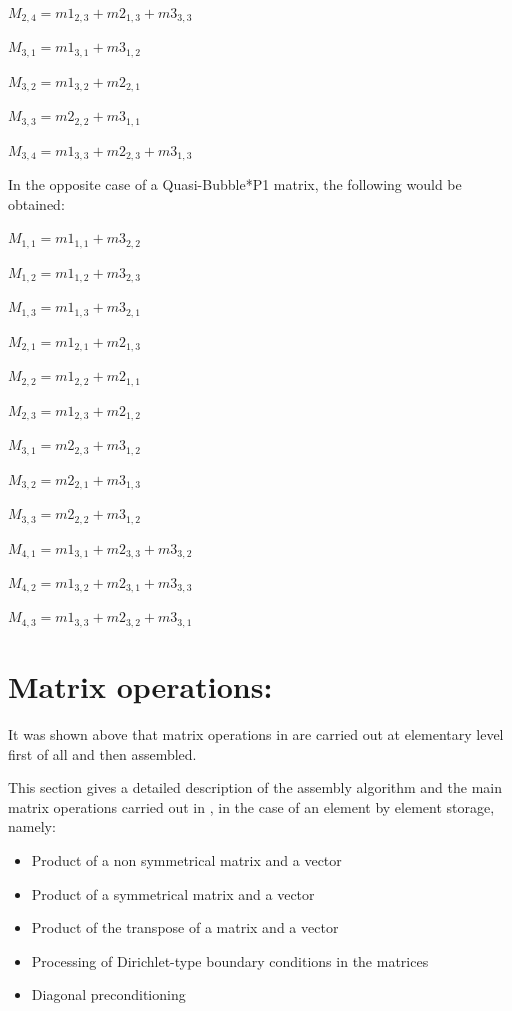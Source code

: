 $M_{2,4} = m1_{2,3} + m2_{1,3} + m3_{3,3}$

$M_{3,1} = m1_{3,1} + m3_{1,2}$

$M_{3,2} = m1_{3,2} + m2_{2,1}$

$M_{3,3} = m2_{2,2} + m3_{1,1}$

$M_{3,4} = m1_{3,3} + m2_{2,3} + m3_{1,3}$

In the opposite case of a Quasi-Bubble*P1 matrix, the following would be obtained:

$M_{1,1} = m1_{1,1} + m3_{2,2}$

$M_{1,2} = m1_{1,2} + m3_{2,3}$

$M_{1,3} = m1_{1,3} + m3_{2,1}$

$M_{2,1} = m1_{2,1} + m2_{1,3}$

$M_{2,2} = m1_{2,2} + m2_{1,1}$

$M_{2,3} = m1_{2,3} + m2_{1,2}$

$M_{3,1} = m2_{2,3} + m3_{1,2}$

$M_{3,2} = m2_{2,1} + m3_{1,3}$

$M_{3,3} = m2_{2,2} + m3_{1,2}$

$M_{4,1} = m1_{3,1} + m2_{3,3} + m3_{3,2}$

$M_{4,2} = m1_{3,2} + m2_{3,1} + m3_{3,3}$

$M_{4,3} = m1_{3,3} + m2_{3,2} + m3_{3,1}$

\section{Matrix operations:}

It was shown above that matrix operations in \bief are carried out at elementary
level first of all and then assembled.

This section gives a detailed description of the assembly algorithm and the
main matrix operations carried out in \bief, in the case of an element by
element storage, namely:
\begin{itemize}
  \item Product of a non symmetrical matrix and a vector
  \item Product of a symmetrical matrix and a vector
  \item Product of the transpose of a matrix and a vector
  \item Processing of Dirichlet-type boundary conditions in the matrices
  \item Diagonal preconditioning
\end{itemize}

